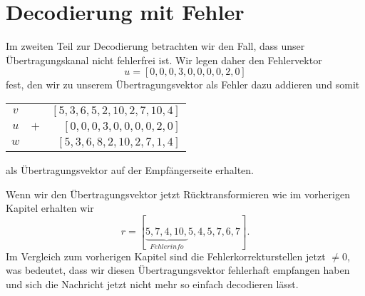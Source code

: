 %
%
%
\section{Decodierung mit Fehler
\label{reedsolomon:section:decmitfehler}}
Im zweiten Teil zur Decodierung betrachten wir den Fall, dass unser Übertragungskanal nicht fehlerfrei ist.
Wir legen daher den Fehlervektor
\[
u = [0, 0, 0, 3, 0, 0, 0, 0, 2, 0]
\]
fest, den wir zu unserem Übertragungsvektor als Fehler dazu addieren und somit

\begin{center}

\begin{tabular}{c | c r }
	$v$ & & $[5,3,6,5,2,10,2,7,10,4]$\\
	$u$ & $+$ & $[0,0,0,3,0,0,0,0,2,0]$\\
	\hline
	$w$ & & $[5,3,6,8,2,10,2,7,1,4]$\\
\end{tabular}


\end{center}
als Übertragungsvektor auf der Empfängerseite erhalten. 

Wenn wir den Übertragungsvektor jetzt Rücktransformieren wie im vorherigen Kapitel erhalten wir
\[
r = [\underbrace{5,7,4,10,}_{Fehlerinfo}5,4,5,7,6,7].
\]
Im Vergleich zum vorherigen Kapitel sind die Fehlerkorrekturstellen jetzt $\neq 0$, was bedeutet, dass wir diesen Übertragungsvektor fehlerhaft empfangen haben und sich die Nachricht jetzt nicht mehr so einfach decodieren lässt.

